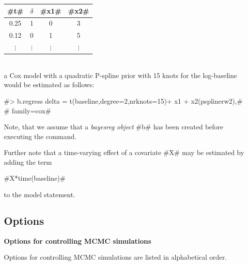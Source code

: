 \vspace{0.5cm}

\begin{tabular}{c|c|c|c}
  #t# &   $\delta$ &  #x1# &  #x2#\\\hline\hline
0.25  &  1  &    0  &  3\\\hline 0.12  &  0  &    1  &  5\\\hline
$\vdots$ & $\vdots$ & $\vdots$ & $\vdots$ \\
\end{tabular}
\vspace{0.5cm}\\
a Cox model with a quadratic P-spline prior with 15 knots for the
log-baseline would be estimated as follows:

 #> b.regress delta = t(baseline,degree=2,nrknots=15)+ x1 + x2(psplinerw2),#\\
 #  family=cox#

Note, that we assume that a {\em bayesreg object} #b# has been
created before executing the command.

Further note that a time-varying effect of a covariate #X# may be
estimated by adding the term

#X*time(baseline)#

to the model statement.

\subsection{Options}
\label{regressoptions}

\vspace{0.4cm}

{\bf Options for controlling MCMC simulations}
\label{mcmc_options}

Options for controlling MCMC simulations are listed in
alphabetical order.

